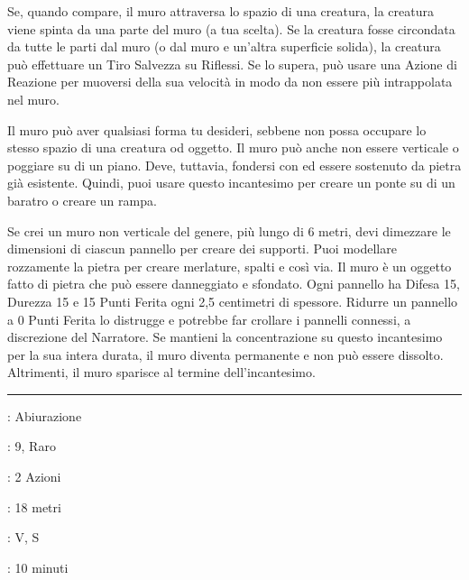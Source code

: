 \begin{multicols}{2}
Se, quando compare, il muro attraversa lo spazio di una creatura, la creatura viene spinta da una parte del muro (a tua scelta). Se la creatura fosse circondata da tutte le parti dal muro (o dal muro e un'altra superficie solida), la creatura può effettuare un Tiro Salvezza su Riflessi. Se lo supera, può usare una Azione di Reazione per muoversi della sua velocità in modo da non essere più intrappolata nel muro.

Il muro può aver qualsiasi forma tu desideri, sebbene non possa occupare lo stesso spazio di una creatura od oggetto. Il muro può anche non essere verticale o poggiare su di un piano. Deve, tuttavia, fondersi con ed essere sostenuto da pietra già esistente. Quindi, puoi usare questo incantesimo per creare un ponte su di un baratro o creare un rampa.

Se crei un muro non verticale del genere, più lungo di 6 metri, devi dimezzare le dimensioni di ciascun pannello per creare dei supporti. Puoi modellare rozzamente la pietra per creare merlature, spalti e così via. Il muro è un oggetto fatto di pietra che può essere danneggiato e sfondato. Ogni pannello ha Difesa 15, Durezza 15 e 15 Punti Ferita ogni 2,5 centimetri di spessore. Ridurre un pannello a 0 Punti Ferita lo distrugge e potrebbe far crollare i pannelli connessi, a discrezione del Narratore. Se mantieni la concentrazione su questo incantesimo per la sua intera durata, il muro diventa permanente e non può essere dissolto. Altrimenti, il muro sparisce al termine dell'incantesimo.

\smallskip\noindent\rule{\linewidth}{2pt} \hypertarget{Muro Prismatico}{}\medskip{}
\noindent
\begin{description}[noitemsep, topsep=0pt, parsep=0pt, partopsep=0pt, leftmargin=0cm, labelwidth=2.8cm]
	\item[\textbf{Lista di Magia}]: Abiurazione
	\item[\textbf{Livello}]: 9, Raro
	\item[\textbf{T. di Lancio}]: 2 Azioni
	\item[\textbf{Gittata}]: 18 metri
	\item[\textbf{Componenti}]: V, S
	\item[\textbf{Durata}]: 10 minuti
\end{description}


\end{multicols}
